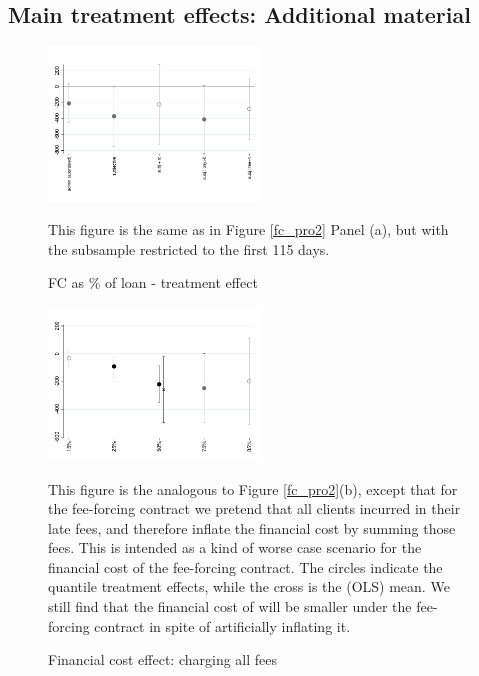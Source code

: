 \documentclass[oneside,11pt]{article}
\begin{document}
\newpage
\subsection{Main treatment effects: Additional material}

\vspace{.2in}



\begin{figure}[H]
        \caption{FC as \% of loan - treatment effect}
    \label{fc_pro_2_115}
    \begin{center}
        \centering
        \includegraphics[width=0.50\textwidth]{Figuras/fc_te_115_pro_2.pdf}
    \end{center}
     \scriptsize This figure is the same as in Figure \ref{fc_pro2} Panel (a), but with the subsample restricted to the first 115 days.
\end{figure}



\begin{figure}[H]
        \caption{Financial cost effect: charging all fees}
    \label{fc_allfee}
    \begin{center}
        \centering
        \includegraphics[width=0.50\textwidth]{Figuras/fc_allfee_quantile_pro_2.pdf}
    \end{center}
    \scriptsize
     This figure is the analogous to Figure \ref{fc_pro2}(b), except that for the fee-forcing contract we pretend that all clients incurred in their late fees, and therefore inflate the financial cost by summing those fees. This is intended as a kind of worse case scenario for the financial cost of the fee-forcing contract. The circles indicate the quantile treatment effects, while the cross is the (OLS) mean. We still find that the financial cost of will be smaller under the fee-forcing contract in spite of artificially inflating it.
\end{figure}
\end{document}
